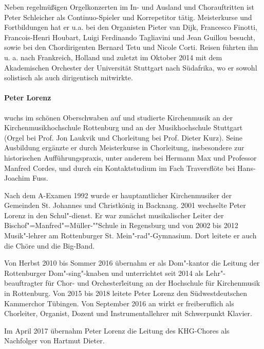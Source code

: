\documentclass[a5paper,twoside,fontsize=10pt]{scrartcl}
\begin{document}
Neben regelmüßigen Orgelkonzerten im In- und Ausland und Chorauftritten ist Peter Schleicher als Continuo-Spieler und Korrepetitor tätig.
Meisterkurse und Fortbildungen hat er u.a. bei den Organisten Pieter van Dijk, Francesco Finotti, Francois-Henri Houbart, Luigi Ferdinando Tagliavini und Jean Guillou besucht, sowie bei den Chordirigenten Bernard Tetu und Nicole Corti.
Reisen führten ihn u. a. nach Frankreich, Holland und zuletzt im Oktober 2014 mit dem Akademischen Orchester der Universität Stuttgart nach Südafrika, wo er sowohl solistisch als auch dirigentisch mitwirkte.


\paragraph{Peter Lorenz} wuchs im schönen Oberschwaben auf und studierte Kirchenmusik an der Kirchenmusikhochschule Rottenburg und an der Musikhochschule Stuttgart (Orgel bei Prof. Jon Laukvik und Chorleitung bei Prof. Dieter Kurz).
Seine Ausbildung ergänzte er durch Meisterkurse in Chorleitung, insbesondere zur historischen Aufführungspraxis, unter anderem bei Hermann Max und Professor Manfred Cordes, und durch ein Kontaktstudium im Fach Traversflöte bei Hans-Joachim Fuss.

Nach dem A-Examen 1992 wurde er hauptamtlicher Kirchenmusiker der Gemeinden St. Johannes und Christkönig in Backnang.
2001 wechselte Peter Lorenz in den Schul"-dienst.
Er war zunächst musikalischer Leiter der Bischof"=Manfred"=Müller-""Schule in Regensburg und von 2002 bis 2012 Musik"-lehrer am Rottenburger St. Mein"-rad"-Gymnasium.
Dort leitete er auch die Chöre und die Big-Band.

Von Herbst 2010 bis Sommer 2016 übernahm er als Dom"-kantor die Leitung der Rottenburger Dom"-sing"-knaben und unterrichtet seit 2014 als Lehr"-beauftragter für Chor- und Orchester\"leitung an der Hochschule für Kirchenmusik in Rottenburg.
Von 2015 bis 2018 leitete Peter Lorenz den Südwestdeutschen Kammerchor Tübingen.
Von September 2016 an wirkt er freiberuflich als Chorleiter, Organist, Dozent und Instrumentallehrer mit Schwerpunkt Klavier.

Im April 2017 übernahm Peter Lorenz die Leitung des KHG-Chores als Nachfolger von Hartmut Dieter.
\end{document}
